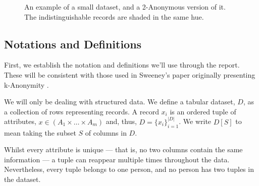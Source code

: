\begin{figure}
\centering
{}
\caption{An example of a small dataset, and a 2-Anonymous version of it. The indistinguishable records are shaded in the same hue.}
\label{fig:basic_example}
\end{figure}

\subsection{Notations and Definitions}
First, we establish the notation and definitions we'll use through the report. These will be consistent with those used in Sweeney's paper originally presenting k-Anonymity \cite{kanon_orig}.


We will only be dealing with structured data. We define a tabular dataset, $D$, as a collection of rows representing records. A record $x_i$ is an ordered tuple of attributes, $x \in (A_1 \times \dots \times A_m)$ and, thus, $D=\{x_i\}_{i=1}^{|D|}$. We write $D[S]$ to mean taking the subset $S$ of columns in $D$.

Whilst every attribute is unique --- that is, no two columns contain the same information --- a tuple can reappear multiple times throughout the data. Nevertheless, every tuple belongs to one person, and no person has two tuples in the dataset.

